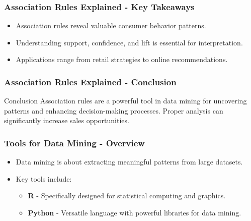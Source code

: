 \documentclass[aspectratio=169]{beamer}
\begin{document}
\begin{frame}[fragile]
    \frametitle{Association Rules Explained - Key Takeaways}
    \begin{itemize}
        \item Association rules reveal valuable consumer behavior patterns.
        \item Understanding support, confidence, and lift is essential for interpretation.
        \item Applications range from retail strategies to online recommendations.
    \end{itemize}
\end{frame}

\begin{frame}[fragile]
    \frametitle{Association Rules Explained - Conclusion}
    \begin{block}{Conclusion}
        Association rules are a powerful tool in data mining for uncovering patterns and enhancing decision-making processes. Proper analysis can significantly increase sales opportunities.
    \end{block}
\end{frame}

\begin{frame}[fragile]
    \frametitle{Tools for Data Mining - Overview}
    \begin{itemize}
        \item Data mining is about extracting meaningful patterns from large datasets.
        \item Key tools include:
        \begin{itemize}
            \item \textbf{R} - Specifically designed for statistical computing and graphics.
            \item \textbf{Python} - Versatile language with powerful libraries for data mining.
        \end{itemize}
    \end{itemize}
\end{frame}
\end{document}

